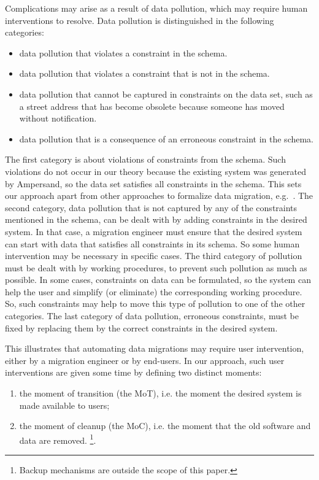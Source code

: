 \documentclass{elsarticle}
\begin{document}
   Complications may arise as a result of data pollution,
   which may require human interventions to resolve.
   Data pollution is distinguished in the following categories:
\begin{itemize}
   \item data pollution that violates a constraint in the schema.
   \item data pollution that violates a constraint that is not in the schema.
   \item data pollution that cannot be captured in constraints on the data set,
   such as a street address that has become obsolete because someone has moved without notification.
   \item data pollution that is a consequence of an erroneous constraint in the schema.
\end{itemize}
   The first category is about violations of constraints from the schema.
   Such violations do not occur in our theory because the existing system was generated by Ampersand,
   so the data set satisfies all constraints in the schema.
   This sets our approach apart from other approaches to formalize data migration, e.g.~\cite{Thalheim2013}.
   The second category, data pollution that is not captured by any of the constraints mentioned in the schema,
   can be dealt with by adding constraints in the desired system.
   In that case, a migration engineer must ensure that the desired system can start with data that satisfies all constraints in its schema.
   So some human intervention may be necessary in specific cases.
   The third category of pollution must be dealt with by working procedures, to prevent such pollution as much as possible.
   In some cases, constraints on data can be formulated,
   so the system can help the user and simplify (or eliminate) the corresponding working procedure.
   So, such constraints may help to move this type of pollution to one of the other categories.
   The last category of data pollution, erroneous constraints, must be fixed by replacing them by the correct constraints in the desired system.

   This illustrates that automating data migrations may require user intervention,
   either by a migration engineer or by end-users.
   In our approach, such user interventions are given some time by
   defining two distinct moments:
\begin{enumerate}
   \item the moment of transition (the MoT), i.e. the moment the desired system is made available to users;
   \item the moment of cleanup (the MoC), i.e. the moment that the old software and data are removed.%
\footnote{Backup mechanisms are outside the scope of this paper.}.
\end{enumerate}
\end{document}
